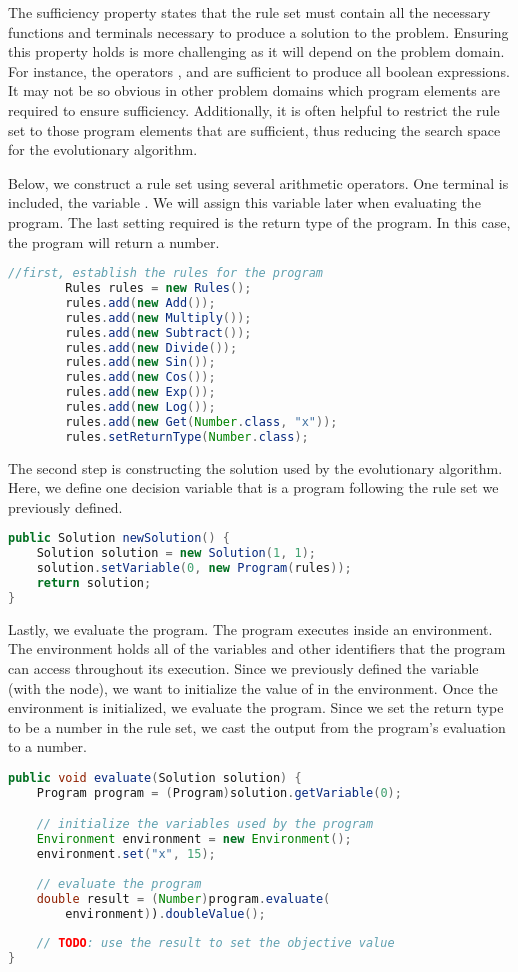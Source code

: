 The sufficiency property states that the rule set must contain all the necessary functions and terminals necessary to produce a solution to the problem.  Ensuring this property holds is more challenging as it will depend on the problem domain.  For instance, the operators ,  and  are sufficient to produce all boolean expressions.  It may not be so obvious in other problem domains which program elements are required to ensure sufficiency.  Additionally, it is often helpful to restrict the rule set to those program elements that are sufficient, thus reducing the search space for the evolutionary algorithm.

Below, we construct a rule set using several arithmetic operators.  One terminal is included, the variable .  We will assign this variable later when evaluating the program.  The last setting required is the return type of the program.  In this case, the program will return a number.
\begin{lstlisting}[language=Java]
    //first, establish the rules for the program
		Rules rules = new Rules();
		rules.add(new Add());
		rules.add(new Multiply());
		rules.add(new Subtract());
		rules.add(new Divide());
		rules.add(new Sin());
		rules.add(new Cos());
		rules.add(new Exp());
		rules.add(new Log());
		rules.add(new Get(Number.class, "x"));
		rules.setReturnType(Number.class);
\end{lstlisting}

The second step is constructing the solution used by the evolutionary algorithm.  Here, we define one decision variable that is a program following the rule set we previously defined.
\begin{lstlisting}[language=Java]
public Solution newSolution() {
    Solution solution = new Solution(1, 1);
    solution.setVariable(0, new Program(rules));
    return solution;
}
\end{lstlisting}

Lastly, we evaluate the program.  The program executes inside an environment.  The environment holds all of the variables and other identifiers that the program can access throughout its execution.  Since we previously defined the variable  (with the  node), we want to initialize the value of  in the environment.  Once the environment is initialized, we evaluate the program.  Since we set the return type to be a number in the rule set, we cast the output from the program's evaluation to a number.
\begin{lstlisting}[language=Java]
public void evaluate(Solution solution) {
    Program program = (Program)solution.getVariable(0);

    // initialize the variables used by the program
    Environment environment = new Environment();
    environment.set("x", 15);
    
    // evaluate the program
    double result = (Number)program.evaluate(
        environment)).doubleValue();
        
    // TODO: use the result to set the objective value
}
\end{lstlisting}

